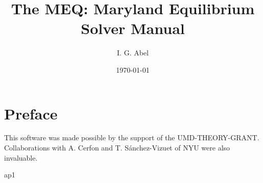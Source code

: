 \documentclass[a4paper,twoside,12pt,openright]{memoir}
\providecommand{\meq}{\textsc{MEQ}}
\begin{document}
\title{The \meq: Maryland Equilibrium Solver Manual}
\date{\today}
\author{I. G. Abel}


\maketitle
\frontmatter


\tableofcontents



\chapter{Preface}
This software was made possible by the support of the UMD-THEORY-GRANT. Collaborations with 
A. Cerfon and T. S\'anchez-Vizuet of NYU were also invaluable.

\mainmatter




\appendix

 {ap1}

\backmatter

\clearpage
{
}
{
\raggedright %

{}
\nobibintoc


}
\end{document}
